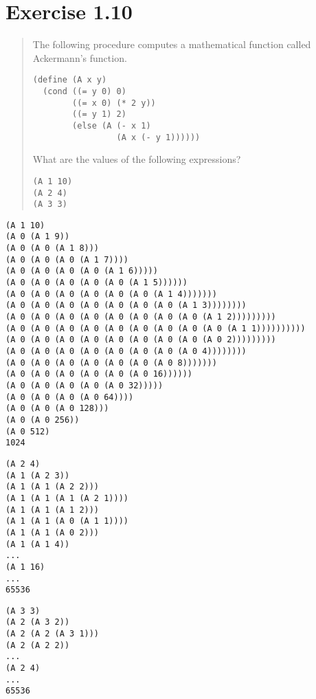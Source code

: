\documentclass{article}
\begin{document}
\section{Exercise 1.10}
\begin{quote}
	The following procedure computes a mathematical function called Ackermann’s
	function.
    \begin{lstlisting}
(define (A x y)
  (cond ((= y 0) 0)
        ((= x 0) (* 2 y))
        ((= y 1) 2)
        (else (A (- x 1)
                 (A x (- y 1))))))
    \end{lstlisting}
    What are the values of the following expressions?

    \verb|(A 1 10)|\\
    \verb|(A 2 4)|\\
    \verb|(A 3 3)|\\
\end{quote}

\begin{minipage}{\linewidth}
\begin{verbatim}
(A 1 10)
(A 0 (A 1 9))
(A 0 (A 0 (A 1 8)))
(A 0 (A 0 (A 0 (A 1 7))))
(A 0 (A 0 (A 0 (A 0 (A 1 6)))))
(A 0 (A 0 (A 0 (A 0 (A 0 (A 1 5))))))
(A 0 (A 0 (A 0 (A 0 (A 0 (A 0 (A 1 4)))))))
(A 0 (A 0 (A 0 (A 0 (A 0 (A 0 (A 0 (A 1 3))))))))
(A 0 (A 0 (A 0 (A 0 (A 0 (A 0 (A 0 (A 0 (A 1 2)))))))))
(A 0 (A 0 (A 0 (A 0 (A 0 (A 0 (A 0 (A 0 (A 0 (A 1 1))))))))))
(A 0 (A 0 (A 0 (A 0 (A 0 (A 0 (A 0 (A 0 (A 0 2)))))))))
(A 0 (A 0 (A 0 (A 0 (A 0 (A 0 (A 0 (A 0 4))))))))
(A 0 (A 0 (A 0 (A 0 (A 0 (A 0 (A 0 8)))))))
(A 0 (A 0 (A 0 (A 0 (A 0 (A 0 16))))))
(A 0 (A 0 (A 0 (A 0 (A 0 32)))))
(A 0 (A 0 (A 0 (A 0 64))))
(A 0 (A 0 (A 0 128)))
(A 0 (A 0 256))
(A 0 512)
1024
\end{verbatim}\par
\end{minipage}
\vspace{\baselineskip}

\begin{minipage}{\linewidth}
\begin{verbatim}
(A 2 4)
(A 1 (A 2 3))
(A 1 (A 1 (A 2 2)))
(A 1 (A 1 (A 1 (A 2 1))))
(A 1 (A 1 (A 1 2)))
(A 1 (A 1 (A 0 (A 1 1))))
(A 1 (A 1 (A 0 2)))
(A 1 (A 1 4))
...
(A 1 16)
...
65536
\end{verbatim}
\end{minipage}
\vspace{\baselineskip}

\begin{minipage}{\linewidth}
\begin{verbatim}
(A 3 3)
(A 2 (A 3 2))
(A 2 (A 2 (A 3 1)))
(A 2 (A 2 2))
...
(A 2 4)
...
65536
\end{verbatim}\par
\end{minipage}
\vspace{\baselineskip}
\end{document}
